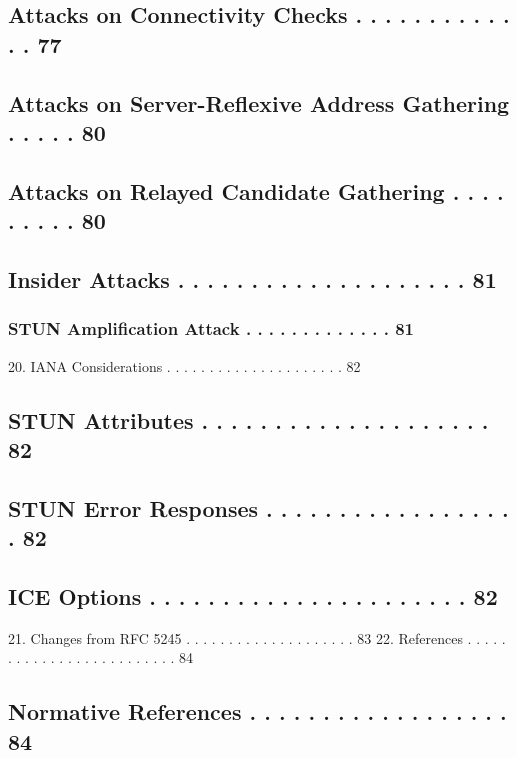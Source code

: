 \documentclass{article}
\begin{document}
\subsection{Attacks on Connectivity Checks . . . . . . . . . . . . .  77}

\subsection{Attacks on Server-Reflexive Address Gathering  . . . . .  80}

\subsection{Attacks on Relayed Candidate Gathering . . . . . . . . .  80}

\subsection{Insider Attacks  . . . . . . . . . . . . . . . . . . . .  81}

\subsubsection{STUN Amplification Attack  . . . . . . . . . . . . .  81}

20. IANA Considerations . . . . . . . . . . . . . . . . . . . . .  82

\subsection{STUN Attributes  . . . . . . . . . . . . . . . . . . . .  82}

\subsection{STUN Error Responses . . . . . . . . . . . . . . . . . .  82}

\subsection{ICE Options  . . . . . . . . . . . . . . . . . . . . . .  82}

21. Changes from RFC 5245 . . . . . . . . . . . . . . . . . . . .  83 22. References  . . . . . . . . . . . . . . . . . . . . . . . . .  84

\subsection{Normative References . . . . . . . . . . . . . . . . . .  84}
\end{document}
